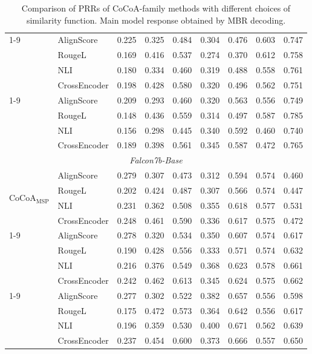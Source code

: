 \documentclass[11pt]{article}
\begin{document}
\begin{table}[htbp]
{\begin{tabular}{ll ccccccc}
\cmidrule(lr){1-9}
\multirow{4}{*}{CoCoA$_{\mathrm{PPL}}$}
 & AlignScore & 0.225 & 0.325 & 0.484 & 0.304 & 0.476 & 0.603 & 0.747 \\
 & RougeL & 0.169 & 0.416 & 0.537 & 0.274 & 0.370 & 0.612 & 0.758 \\
 & NLI & 0.180 & 0.334 & 0.460 & 0.319 & 0.488 & 0.558 & 0.761 \\
 & CrossEncoder & 0.198 & 0.428 & 0.580 & 0.320 & 0.496 & 0.562 & 0.751 \\
\cmidrule(lr){1-9}
\multirow{4}{*}{CoCoA$_{\mathrm{MTE}}$}
 & AlignScore & 0.209 & 0.293 & 0.460 & 0.320 & 0.563 & 0.556 & 0.749 \\
 & RougeL & 0.148 & 0.436 & 0.559 & 0.314 & 0.497 & 0.587 & 0.785 \\
 & NLI & 0.156 & 0.298 & 0.445 & 0.340 & 0.592 & 0.460 & 0.740 \\
 & CrossEncoder & 0.189 & 0.398 & 0.561 & 0.345 & 0.587 & 0.472 & 0.765 \\
\midrule
\multicolumn{9}{c}{\textit{Falcon7b-Base}} \\
\midrule
\multirow{4}{*}{CoCoA$_{\mathrm{MSP}}$}
 & AlignScore & 0.279 & 0.307 & 0.473 & 0.312 & 0.594 & 0.574 & 0.460 \\
 & RougeL & 0.202 & 0.424 & 0.487 & 0.307 & 0.566 & 0.574 & 0.447 \\
 & NLI & 0.231 & 0.362 & 0.508 & 0.355 & 0.618 & 0.577 & 0.531 \\
 & CrossEncoder & 0.248 & 0.461 & 0.590 & 0.336 & 0.617 & 0.575 & 0.472 \\
\cmidrule(lr){1-9}
\multirow{4}{*}{CoCoA$_{\mathrm{PPL}}$}
 & AlignScore & 0.278 & 0.320 & 0.534 & 0.350 & 0.607 & 0.574 & 0.617 \\
 & RougeL & 0.190 & 0.428 & 0.556 & 0.333 & 0.571 & 0.574 & 0.632 \\
 & NLI & 0.216 & 0.376 & 0.549 & 0.368 & 0.623 & 0.578 & 0.661 \\
 & CrossEncoder & 0.242 & 0.462 & 0.613 & 0.345 & 0.624 & 0.575 & 0.662 \\
\cmidrule(lr){1-9}
\multirow{4}{*}{CoCoA$_{\mathrm{MTE}}$}
 & AlignScore & 0.277 & 0.302 & 0.522 & 0.382 & 0.657 & 0.556 & 0.598 \\
 & RougeL & 0.175 & 0.472 & 0.573 & 0.364 & 0.642 & 0.556 & 0.617 \\
 & NLI & 0.196 & 0.359 & 0.530 & 0.400 & 0.671 & 0.562 & 0.639 \\
 & CrossEncoder & 0.237 & 0.454 & 0.600 & 0.373 & 0.666 & 0.557 & 0.650 \\
\bottomrule
\end{tabular}%
}
\caption{Comparison of PRRs of CoCoA-family methods with different choices of similarity function. Main model response obtained by MBR decoding.}
\label{tab:cocoa_table7}
\end{table}
\end{document}
